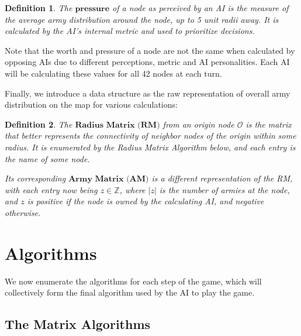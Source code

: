 \documentclass[12pt]{article}  %
\newtheorem{definition}{Definition}
\begin{document}
\begin{definition} \label{pressure}
The $\textbf{pressure}$ of a node as perceived by an AI is the measure of the average army distribution around the node, up to 5 unit radii away. It is calculated by the AI's internal metric and used to prioritize decisions.
\end{definition}

Note that the worth and pressure of a node are not the same when calculated by opposing AIs due to different perceptions, metric and AI personalities. Each AI will be calculating these values for all 42 nodes at each turn.

Finally, we introduce a data structure as the raw representation of overall army distribution on the map for various calculations:

\begin{definition} \label{RMAM}
The $\textbf{Radius Matrix (RM)}$ from an origin node $\mathcal{O}$ is the matrix that better represents the connectivity of neighbor nodes of the origin within some radius. It is enumerated by the Radius Matrix Algorithm below, and each entry is the name of some node.

Its corresponding $\textbf{Army Matrix (AM)}$ is a different representation of the RM, with each entry now being $z \in \mathbb{Z}$, where $|z|$ is the number of armies at the node, and $z$ is positive if the node is owned by the calculating AI, and negative otherwise.
\end{definition}







\section{Algorithms}

We now enumerate the algorithms for each step of the game, which will collectively form the final algorithm used by the AI to play the game.


\subsection{The Matrix Algorithms}
\end{document}
